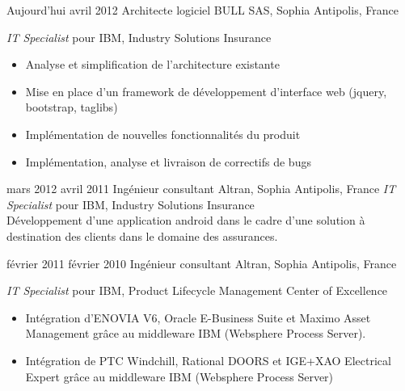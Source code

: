 \documentclass[]{roger-cv}
\begin{document}
\begin{entrylist}
  \entry
    {Aujourd'hui}
    {avril 2012}
    {Architecte logiciel}
    {BULL SAS, Sophia Antipolis, France}  
    {
      \emph{IT Specialist} pour IBM, Industry Solutions Insurance\\ 
      \vspace{-3mm}
      \begin{itemize}
        \item{Analyse et simplification de l'architecture existante}
        \item{Mise en place d'un framework de développement d'interface web (jquery, bootstrap, taglibs)}
        \item{Implémentation de nouvelles fonctionnalités du produit}
        \item{Implémentation, analyse et livraison de correctifs de bugs}
       \end{itemize}
    }

  \entry
    {mars 2012}
    {avril 2011}
    {Ingénieur consultant}
    {Altran, Sophia Antipolis, France}  
    {
      \emph{IT Specialist} pour IBM, Industry Solutions Insurance\\ 
      Développement d'une application android dans le cadre d'une solution à destination 
      des clients dans le domaine des assurances.
    }

  \entry
    {février 2011}
    {février 2010}
    {Ingénieur consultant}
    {Altran, Sophia Antipolis, France}  
    {
      \emph{IT Specialist} pour IBM, Product Lifecycle Management Center of Excellence\\
      \vspace{-3mm}
        \begin{itemize}
           \item Intégration d'ENOVIA V6, Oracle E-Business Suite et Maximo Asset Management grâce au middleware IBM (Websphere Process Server).
 	\item Intégration de PTC Windchill, Rational DOORS et IGE+XAO Electrical Expert grâce au middleware IBM (Websphere Process Server)
         \end{itemize}
    }


\end{entrylist}
\end{document}

